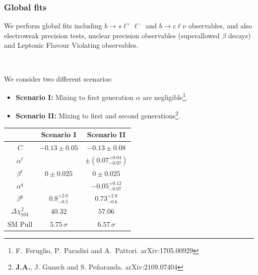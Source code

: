 \documentclass[mathserif, 10pt]{beamer}
\begin{document}
\begin{frame}
    \frametitle{Global fits}
    We perform global fits including $b\to s \ell^+\ell^-$ and
    $b\to c\ell\nu$ observables, and also electroweak precision tests,
    nuclear precision observables (superallowed $\beta$ decays) and Leptonic Flavour Violating observables.

    ~

    We consider two different scenarios:
    \begin{itemize}
        \item \textbf{Scenario I:} Mixing to first generation $\alpha$ are negligible\footnote[1]{F.~Feruglio, P.~Paradisi and A.~Pattori. arXiv:1705.00929}.
        \item \textbf{Scenario II:} Mixing to first and second generations\footnote[2]{\textbf{J.A.}, J. Guasch and S. Peñaranda. arXiv:2109.07404}.
    \end{itemize}
    \begin{center}\small
        \begin{tabular}{|c|c|c|}\hline
             & Scenario I & Scenario II \\\hline
            $C$ & $-0.13 \pm 0.05$ & $-0.13 \pm 0.08$             \\\hline
            $\alpha^\ell$ & & $\pm (0.07^{+0.04}_{-0.07})$ \\\hline
            $\beta^\ell$  & $0 \pm 0.025$ & $0 \pm 0.025$ \\\hline
            $\alpha^q$ & & $-0.05^{+0.12}_{-0.07}$ \\\hline
            $\beta^q$ & $0.8^{+2.0}_{-0.5}$ & $0.73^{+2.8}_{-0.6}$ \\\hline
            $\Delta \chi^2_\mathrm{SM}$ & $40.32$ & $57.06$ \\\hline
            SM Pull & $5.75\,\sigma$ & $6.57\,\sigma$               \\\hline
        \end{tabular}
    \end{center}
\end{frame}
\end{document}

